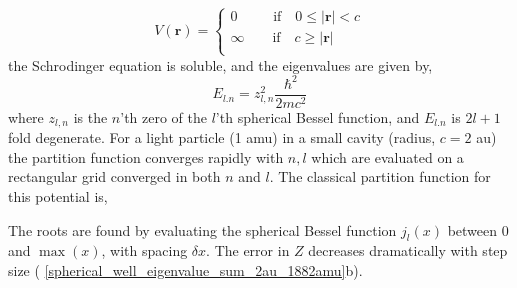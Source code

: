 \documentclass[../main.tex]{subfiles}
\begin{document}
\begin{equation}
V(\boldsymbol{r}) = 
\begin{cases}
0 \qquad\;\; \text{if} \quad 0 \le |\boldsymbol{r}| < c \\
\infty \qquad \text{if} \quad  c \ge |\boldsymbol{r}| \\
\end{cases}
\end{equation}
the Schrodinger equation is soluble,\cite{Huang2016} and the eigenvalues are given by,
\begin{equation}
E_{l.n} = z_{l, n}^2 \frac{\hbar^2}{2mc^2}
\end{equation}
where $z_{l, n}$ is the $n$'th zero of the $l$'th spherical Bessel function, and $E_{l.n}$ is $2l+1$ fold degenerate. For a light particle (1 amu) in a small cavity (radius, $c = 2$ au) the partition function converges rapidly with $n, l$ which are evaluated on a rectangular grid converged in both $n$ and $l$. The classical partition function for this potential is,



\iffalse
The roots are found by evaluating the spherical Bessel function $j_l(x)$ between 0 and $\max(x)$, with spacing $\delta x$. The error in $Z$ decreases dramatically with step size (\figurename{ \ref{spherical_well_eigenvalue_sum_2au_1882amu}}b).
\end{document}
